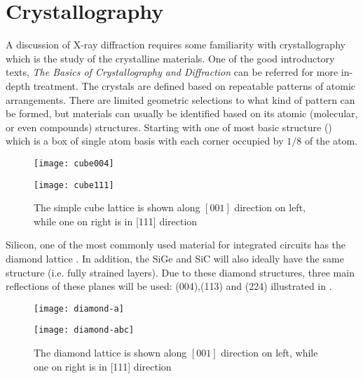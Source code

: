 	\section{Crystallography}

A discussion of X-ray diffraction requires some familiarity with crystallography which is the study of the crystalline materials.  One of the good introductory texts, \textit{The Basics of Crystallography and Diffraction} \cite{Hammond1} can be referred for more in-depth treatment.  The crystals are defined based on repeatable patterns of atomic arrangements.  There are limited geometric selections to what kind of pattern can be formed, but materials can usually be identified based on its atomic (molecular, or even compounds) structures.  Starting with one of most basic structure () which is a box of single atom basis with each corner occupied by $1/8$ of the atom.

\begin{figure}[h]
\caption{The simple cube lattice is shown along $[001]$ direction on left, while one on right is in [111] direction}
\label{cube}
\begin{minipage}{0.5\linewidth}
\centering
\texttt{[image: cube004]}
\end{minipage}\begin{minipage}{0.5\linewidth}
\texttt{[image: cube111]}
\end{minipage}
\end{figure}

    Silicon, one of the most commonly used material for integrated circuits has the diamond lattice .  In addition, the SiGe and  SiC will also ideally have the same structure (i.e. fully strained layers). Due to these diamond structures,  three main reflections of these planes will be used:  (004),(113) and (224) illustrated in .



\begin{figure}[h]
\caption{The diamond lattice is shown along $[001]$ direction on left, while one on right is in [111] direction}
\label{SiLattice}
\begin{minipage}{0.5\linewidth}
\centering
\texttt{[image: diamond-a]}
\end{minipage}\begin{minipage}{0.5\linewidth}
\texttt{[image: diamond-abc]}
\end{minipage}
\end{figure}

